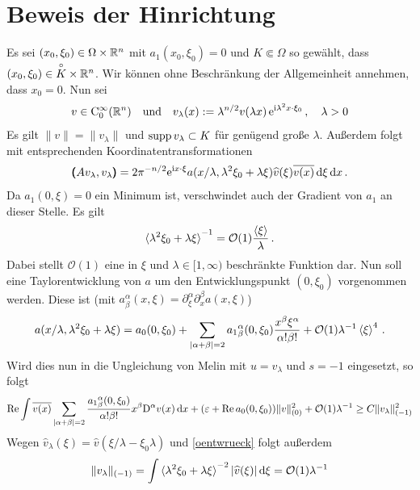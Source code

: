 \section{Beweis der Hinrichtung}

Es sei $(x_0,\xi_0)\in\Omega\times\mathbb R^n$ mit $a_1(x_0,\xi_0)=0$ und $K\Subset \Omega$ so gewählt, dass  $(x_0,\xi_0)\in \overset{\circ} {K}\times\mathbb R^n$. Wir können ohne Beschränkung der Allgemeinheit annehmen, dass $x_0=0$. 
Nun sei 
\begin{align}
 v\in\mathrm C^\infty_0(\mathbb R^n) \quad \text{und} \quad v_\lambda(x):=\lambda^{n/2}v(\lambda x)\, \mathrm e^{\mathrm i\lambda^2x\cdot \xi_0}\, ,\quad\lambda>0
\end{align}
Es gilt $\|v\|=\|v_\lambda\|$ und $\operatorname{supp} v_\lambda \subset K$ für genügend große $\lambda$. Außerdem folgt mit entsprechenden Koordinatentransformationen
\begin{align}
\pmb(A v_\lambda,v_\lambda\pmb) = {2\pi}^{-n/2}\relax \mathrm e^{\mathrm i x\cdot \xi} a(x/\lambda,\lambda^2\xi_0 + \lambda\xi)\widehat v(\xi)\overline{v(x)}\,\mathrm d\xi\,\mathrm d x\,.
\end{align}
Da $a_1(0,\xi)=0$ ein Minimum  ist, verschwindet auch der Gradient von $a_1$ an dieser Stelle. Es gilt
\begin{align}\label{oentwrueck}
\braket{\lambda^2\xi_0 + \lambda\xi}^{-1} = \mathcal O(1)\frac{\braket{\xi}}{\lambda}\,.
\end{align}
Dabei stellt $\mathcal O(1)$ eine in $\xi$ und $\lambda\in[1,\infty)$ beschränkte Funktion dar. Nun soll eine Taylorentwicklung von $a$ um den Entwicklungspunkt $(0,\xi_0)$ vorgenommen werden. Diese ist (mit $a^\alpha_\beta(x,\xi) = \partial_\xi^\alpha \partial_x^\beta a(x,\xi)$)
\begin{align}
a(x/\lambda, \lambda^2\xi_0+\lambda\xi) = a_0(0,\xi_0) + \sum_{\lvert\alpha+\beta\rvert=2} {a_1}^\alpha_\beta(0,\xi_0)\frac{x^\beta\xi^\alpha}{\alpha!\beta!} + \mathcal O(1) \lambda^{-1}\braket{\xi}^4\,.
\end{align}
Wird dies nun in die Ungleichung von Melin mit $u=v_\lambda$ und $s=-1$ eingesetzt, so folgt
\begin{align}
\operatorname{Re}\int \overline{v(x)}\sum_{\lvert\alpha+\beta\rvert=2}\frac{{a_1}^\alpha_\beta(0,\xi_0)}{\alpha!\beta!}x^\beta\mathrm D^\alpha v(x)\,\mathrm d x + (\varepsilon +\operatorname{Re} a_0(0,\xi_0))\|v\|_{(0)}^2 + \mathcal O(1)\lambda^{-1}\ge C\|v_\lambda\|_{(-1)}^2
\end{align}
Wegen $\widehat{v}_\lambda(\xi)=\widehat{v}(\xi/\lambda-\xi_0\lambda)$ und \eqref{oentwrueck} folgt außerdem
\begin{align}
\|v_\lambda\|_{(-1)} = \int \braket{\lambda^2\xi_0+\lambda \xi}^{-2}|\widehat{v}(\xi)|\,\mathrm d\xi = \mathcal{O}(1)\lambda^{-1} 
\end{align}
